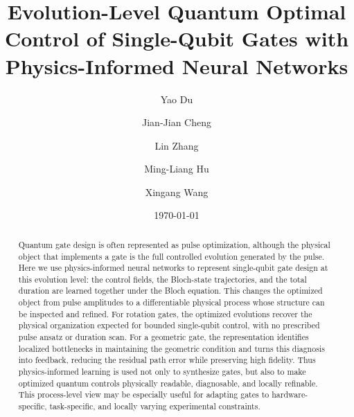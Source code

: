 \documentclass[aps,prx,reprint,superscriptaddress,nofootinbib,longbibliography,floatfix,showkeys]{revtex4-2}
\begin{document}
\title{Evolution-Level Quantum Optimal Control of Single-Qubit Gates with Physics-Informed Neural Networks}

\author{Yao Du}
\author{Jian-Jian Cheng}
\author{Lin Zhang}
\author{Ming-Liang Hu}
\author{Xingang Wang}
\date{\today}

\begin{abstract}
Quantum gate design is often represented as pulse optimization, although the
physical object that implements a gate is the full controlled evolution
generated by the pulse.  Here we use physics-informed neural networks to
represent single-qubit gate design at this evolution level: the control
fields, the Bloch-state trajectories, and the total duration are learned together
under the Bloch equation.  This changes the optimized object from pulse
amplitudes to a differentiable physical process whose structure can be
inspected and refined.  For rotation gates, the optimized evolutions recover
the physical organization expected for bounded single-qubit control, with no
prescribed pulse ansatz or duration scan.  For a geometric gate, the
representation identifies localized bottlenecks in maintaining the geometric
condition and turns this diagnosis into feedback, reducing the residual path
error while preserving high fidelity.  Thus physics-informed learning is used
not only to synthesize gates, but also to make optimized quantum controls
physically readable, diagnosable, and locally refinable.  This process-level
view may be especially useful for adapting gates to hardware-specific,
task-specific, and locally varying experimental constraints.
\end{abstract}


\maketitle
\end{document}
